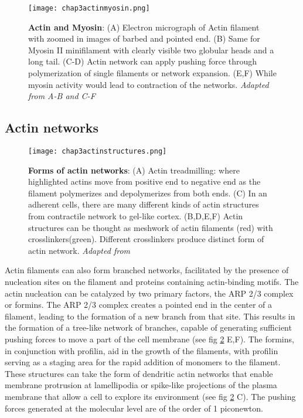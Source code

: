 \begin{figure} []
	\centering
	\texttt{[image: chap3actinmyosin.png]}
	\caption{\label{fig_3_1} \textbf{Actin and Myosin}: (A) Electron micrograph of Actin filament with zoomed in images of barbed and pointed end. (B) Same for Myosin II minifilament with clearly visible two globular heads and a long tail. (C-D) Actin network can apply pushing force through polymerization of single filaments or network expansion. (E,F) While myosin activity would lead to contraction of the networks. \textit{Adapted from A-B \cite{alberts2015} and C-F \cite{clarke2021}}
	}
\end{figure}

\hypertarget{actin-networks}{%
	\subsection{Actin networks}\label{actin-networks}}

\begin{figure}[]
	\centering
	\texttt{[image: chap3actinstructures.png]}
	\caption{\label{fig_3_2} \textbf{Forms of actin networks}: (A) Actin treadmilling: where highlighted actins move from positive end to negative end as the filament polymerizes and depolymerizes from both ends. (C) In an adherent cells, there are many different kinds of actin structures from contractile network to gel-like cortex. (B,D,E,F) Actin structures can be thought as meshwork of actin filaments (red) with crosslinkers(green). Different crosslinkers produce distinct form of actin network.  \textit{Adapted from \cite{alberts2015}}
	}
\end{figure}

Actin filaments can also form branched networks, facilitated by the presence of nucleation sites on the filament and proteins containing actin-binding motifs. The actin nucleation can be catalyzed by two primary factors, the ARP 2/3 complex or formins. The ARP 2/3 complex creates a pointed end in the center of a filament, leading to the formation of a new branch from that site. This results in the formation of a tree-like network of branches, capable of generating sufficient pushing forces to move a part of the cell membrane (see fig \ref{fig_3_2} E,F). The formins, in conjunction with profilin, aid in the growth of the filaments, with profilin serving as a staging area for the rapid addition of monomers to the filament. These structures can take the form of dendritic actin networks that enable membrane protrusion at lamellipodia or spike-like projections of the plasma membrane that allow a cell to explore its environment (see fig \ref{fig_3_2} C). The pushing forces generated at the molecular level are of the order of 1 piconewton.


